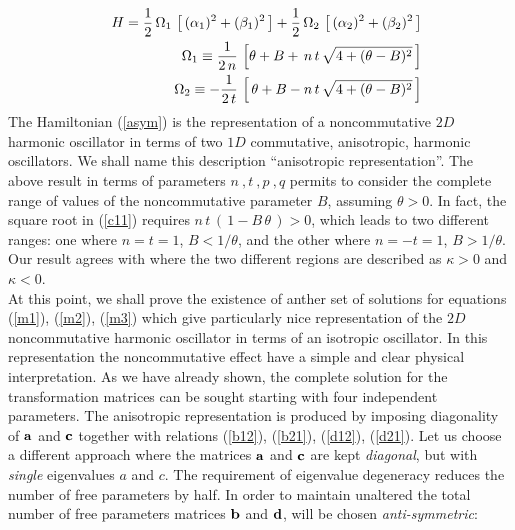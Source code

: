 \documentclass[a4paper,aps,prd,preprint]{revtex4}
\begin{document}
    \begin{eqnarray}
    && H={1\over 2}\, \Omega_1\,\left[\, (\alpha_1)^2 + (\beta_1)^2\,\right]
    +{1\over 2}\,\Omega_2\,\left[\, (\alpha_2)^2 + (\beta_2)^2\,\right]
    \label{asym}\\
    &&\Omega_1 \equiv {1\over 2\, n}\,\left[\theta + B+\,n\, t\,
    \sqrt{ 4 + (\theta-B)^2}  \, \right]\label{fr1}\\	
    &&\Omega_2 \equiv -{1\over 2\,t}\,\left[\,\theta + B
    -n\,t\, \sqrt{ 4 + (\theta-B)^2}\, \right]\label{fr2}\\	
    \end{eqnarray}
    The Hamiltonian (\ref{asym}) is the representation of a noncommutative
    $2D$ harmonic oscillator in terms of two $1D$ commutative, anisotropic,
    harmonic oscillators. We shall name this description ``anisotropic
    representation''.
    The above result in terms of parameters $n\ ,t\ ,p\ ,q$  permits
    to consider the complete range of values of the noncommutative parameter 
    $B$, assuming $\theta >0$.
    In fact, the square root in (\ref{c11}) requires 
    $n\,t\,(\, 1-B\, \theta\,)>0$, which leads to two different ranges:
    one where $n=t=1$, $B<1/\theta$, and the other where $n=-t=1$, 
    $B> 1/\theta$. 
    Our result agrees with \cite{nair} where the two different regions 
    are described as $\kappa> 0$ and $\kappa<0$.\\
     At this point, we shall prove the existence of anther
     set of solutions for equations (\ref{m1}),
    (\ref{m2}), (\ref{m3}) which give  particularly nice representation
    of the  $2D$ noncommutative  harmonic oscillator in terms of an
    isotropic oscillator. In this representation the noncommutative effect
     have a simple and clear physical interpretation.  
    As we have already shown, the complete solution for the transformation 
    matrices can be sought starting with four independent parameters. 
    The anisotropic representation is produced by imposing diagonality
    of  ${\bf a}$ and ${\bf c}$ together with  relations 
    (\ref{b12}), (\ref{b21}), (\ref{d12}), (\ref{d21}). 
    Let us choose a different approach where the  matrices ${\bf a}$ and  
    ${\bf c}$ are kept {\it diagonal}, but with {\it single} eigenvalues $a$ 
    and $c$. The requirement of eigenvalue degeneracy reduces the
    number of free parameters by half. In order to maintain unaltered the total
    number of free parameters matrices ${\bf b}$ and ${\bf d}$,  will be 
    chosen {\it anti-symmetric}:
\end{document}
